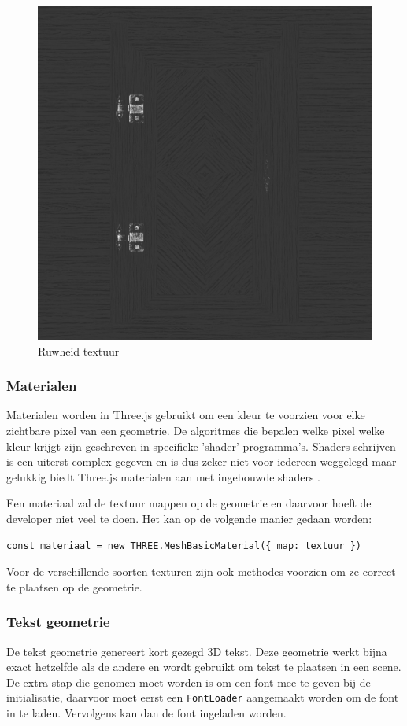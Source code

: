 \begin{figure}[]
	\centering
	\includegraphics[width=.5\linewidth]{graphics/roughnessTexture}
	\caption[Ruwheid textuur]{Ruwheid textuur}
	\label{fig:roughnessTexture}
\end{figure}

\newpage
\subsubsection{Materialen}

Materialen worden in Three.js gebruikt om een kleur te voorzien voor elke zichtbare pixel van een geometrie. De algoritmes die bepalen welke pixel welke kleur krijgt zijn geschreven in specifieke 'shader' programma's. Shaders schrijven is een uiterst complex gegeven en is dus zeker niet voor iedereen weggelegd maar gelukkig biedt Three.js materialen aan met ingebouwde shaders \autocite{Simon2023}.

Een materiaal zal de textuur mappen op de geometrie en daarvoor hoeft de developer niet veel te doen. Het kan op de volgende manier gedaan worden:

\begin{lstlisting}
const materiaal = new THREE.MeshBasicMaterial({ map: textuur })
\end{lstlisting}

Voor de verschillende soorten texturen zijn ook methodes voorzien om ze correct te plaatsen op de geometrie.

\subsubsection{Tekst geometrie}

De tekst geometrie genereert kort gezegd 3D tekst. Deze geometrie werkt bijna exact hetzelfde als de andere en wordt gebruikt om tekst te plaatsen in een scene. De extra stap die genomen moet worden is om een font mee te geven bij de initialisatie, daarvoor moet eerst een \texttt{FontLoader} aangemaakt worden om de font in te laden. Vervolgens kan dan de font ingeladen worden.

